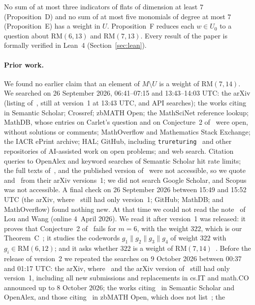 \documentclass[11pt]{article}
\theoremstyle{remark}
\newcommand{\RM}{\mathrm{RM}}
\newcommand{\cat}{\mathbin{\|}}
\begin{document}
No sum of at most three indicators of flats of dimension at least $7$
(Proposition~D) and no sum of at most five monomials of degree at most $7$
(Proposition~E) has a weight in $U$. Proposition~F reduces each $w\in U_0$ to a
question about $\RM(6,13)$ and $\RM(7,13)$. Every result of the paper is
formally verified in Lean~4 (Section~\ref{sec:lean}).

\paragraph{Prior work.}
We found no earlier claim that an element of $M\setminus U$ is a weight of
$\RM(7,14)$. We searched on 26 September 2026, 06:41--07:15 and 13:43--14:03
UTC: the arXiv (listing of~\cite{la}, still at version~1 at 13:43 UTC, and API
searches); the works citing~\cite{la,lw,c24,cs} in Semantic Scholar; Crossref;
zbMATH Open; the MathSciNet reference lookup; MathDB, whose entries on
Carlet's question and on
Conjecture~2 of~\cite{lw} were open, without solutions or comments;
MathOverflow and Mathematics Stack Exchange; the IACR ePrint archive; HAL;
GitHub, including \texttt{trureturing}~\cite{tru} and other repositories of
AI-assisted work on open problems; and web search. Citation queries to OpenAlex
and keyword searches of Semantic Scholar hit rate limits; the full texts
of~\cite{kta}, \cite{c24} and the published version of~\cite{lw} were not
accessible, so we quote~\cite{lw} and~\cite{la} from their arXiv versions~1;
we did not search Google Scholar, and Scopus was not accessible. A final check
on 26 September 2026 between 15:49 and 15:52 UTC (the arXiv, where~\cite{la}
still had only version~1; GitHub; MathDB; and MathOverflow) found nothing new.
At that time we could not read the note~\cite{lw2} of Lou and Wang (online
4~April 2026). We read it after version~1 was released: it proves that
Conjecture~2 of~\cite{lw} fails for $m=6$, with the weight $322$, which is our
Theorem~C~\cite[Proposition~2]{lw2}; it studies the codewords
$g_1\cat g_2\cat g_3\cat g_4$ of weight $322$ with $g_i\in\RM(6,12)$; and it
asks whether $322$ is a weight of $\RM(7,14)$~\cite[Open problem~1]{lw2}.
Before the release of version~2 we repeated the searches on 9 October 2026
between 00:37 and 01:17 UTC: the arXiv, where~\cite{la} and the arXiv version
of~\cite{lw} still had only version~1, including all new submissions and
replacements in cs.IT and math.CO announced up to 8 October 2026; the works
citing~\cite{la,lw,lw2,c24} in Semantic Scholar and OpenAlex, and those
citing~\cite{lw,lw2,c24} in zbMATH Open, which does not list~\cite{la}; the
\end{document}
